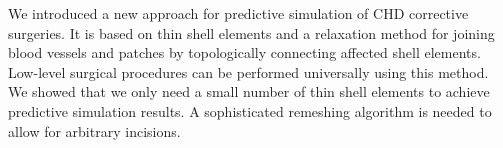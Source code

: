 We introduced a new approach for predictive simulation of CHD corrective surgeries. It is based on thin shell elements and a relaxation method for joining blood vessels and patches by topologically connecting affected shell elements. Low-level surgical procedures can be performed universally using this method. We showed that we only need a small number of thin shell elements to achieve predictive simulation results. A sophisticated remeshing algorithm is needed to allow for arbitrary incisions.